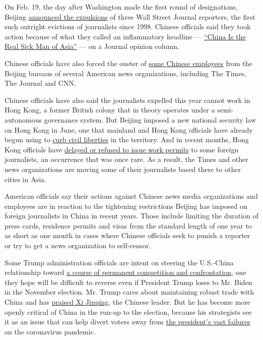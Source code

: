 On Feb. 19, the day after Washington made the first round of
designations, Beijing
\href{https://www.nytimes3xbfgragh.onion/2020/02/19/business/media/china-wall-street-journal.html}{announced
the expulsions} of three Wall Street Journal reporters, the first such
outright evictions of journalists since 1998. Chinese officials said
they took action because of what they called an inflammatory headline
---
\href{https://www.wsj.com/articles/china-is-the-real-sick-man-of-asia-11580773677}{``China
Is the Real Sick Man of Asia''} --- on a Journal opinion column.

Chinese officials have also forced the ouster of
\href{https://www.cjr.org/analysis/chinese-nationals-forced-resignations.php}{some
Chinese employees} from the Beijing bureaus of several American news
organizations, including The Times, The Journal and CNN.

Chinese officials have also said the journalists expelled this year
cannot work in Hong Kong, a former British colony that in theory
operates under a semi-autonomous governance system. But Beijing imposed
a new national security law on Hong Kong in June, one that mainland and
Hong Kong officials have already begun using to
\href{https://www.nytimes3xbfgragh.onion/2020/07/31/world/asia/hong-kong-election-national-security-law.html}{curb
civil liberties} in the territory. And in recent months, Hong Kong
officials have
\href{https://www.nytimes3xbfgragh.onion/2020/07/14/business/media/new-york-times-hong-kong.html}{delayed
or refused to issue work permits} to some foreign journalists, an
occurrence that was once rare. As a result, the Times and other news
organizations are moving some of their journalists based there to other
cities in Asia.

American officials say their actions against Chinese news media
organizations and employees are in reaction to the tightening
restrictions Beijing has imposed on foreign journalists in China in
recent years. Those include limiting the duration of press cards,
residence permits and visas from the standard length of one year to as
short as one month in cases where Chinese officials seek to punish a
reporter or try to get a news organization to self-censor.

Some Trump administration officials are intent on steering the
U.S.-China relationship toward
\href{https://www.nytimes3xbfgragh.onion/2020/07/25/world/asia/us-china-trump-xi.html}{a
course of permanent competition and confrontation}, one they hope will
be difficult to reverse even if President Trump loses to Mr. Biden in
the November election. Mr. Trump cares about maintaining robust trade
with China and has
\href{https://www.nytimes3xbfgragh.onion/2020/06/18/us/politics/trump-china-bolton.html}{praised
Xi Jinping}, the Chinese leader. But he has become more openly critical
of China in the run-up to the election, because his strategists see it
as an issue that can help divert voters away from
\href{https://www.nytimes3xbfgragh.onion/2020/07/18/us/politics/trump-coronavirus-response-failure-leadership.html}{the
president's vast failures} on the coronavirus pandemic.

